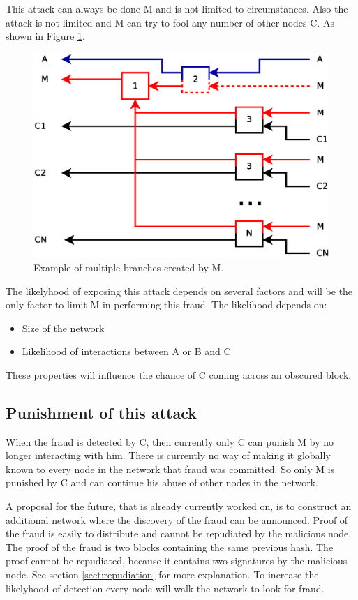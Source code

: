 This attack can always be done M and is not limited to circumstances.
Also the attack is not limited and M can try to fool any number of other nodes C.
As shown in Figure \ref{fig:branch-multiple}.

\begin{figure}
	\centerline{\includegraphics[scale=0.3]{problems/figs/branch-multiple.eps}}
	\caption{Example of multiple branches created by M.}
	\label{fig:branch-multiple}
\end{figure}

The likelyhood of exposing this attack depends on several factors
and will be the only factor to limit M in performing this fraud.
The likelihood depends on:
\begin{itemize}
\item Size of the network
\item Likelihood of interactions between A or B and C
\end{itemize}

These properties will influence the chance of C coming across an obscured block.

\subsection{Punishment of this attack}
When the fraud is detected by C, then currently only C can punish M by no longer interacting with him.
There is currently no way of making it globally known to every node in the network that fraud was committed.
So only M is punished by C and can continue his abuse of other nodes in the network.

A proposal for the future, that is already currently worked on, is to construct an additional network
where the discovery of the fraud can be announced.
Proof of the fraud is easily to distribute and cannot be repudiated by the malicious node.
The proof of the fraud is two blocks containing the same previous hash.
The proof cannot be repudiated, because it contains two signatures by the malicious node.
See section \ref{sect:repudiation} for more explanation.
To increase the likelyhood of detection every node will walk the network to look for fraud.